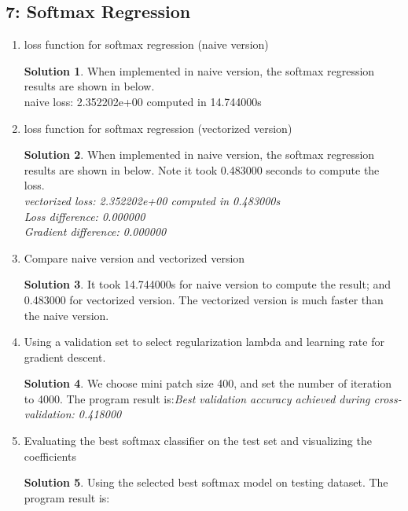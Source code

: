 \documentclass[]{book}
\theoremstyle{definition}
\newtheorem*{soln}{Solution}
\begin{document}
\subsection*{7: Softmax Regression}
\begin{enumerate}
\item loss function for softmax regression (naive version)
\begin{soln}
	When implemented in naive version, the softmax regression results are shown in below. \\
	naive loss: 2.352202e+00 computed in 14.744000s
\end{soln}
\item loss function for softmax regression (vectorized version)
\begin{soln}
	When implemented in naive version, the softmax regression results are shown in below. Note it took 0.483000 seconds to compute the loss. \\
	\textsl{
	vectorized loss: 2.352202e+00 computed in 0.483000s \\
	Loss difference: 0.000000 \\
	Gradient difference: 0.000000}
\end{soln}
\item Compare naive version and vectorized version

\begin{soln}
	It took 14.744000s for naive version to compute the result; and 0.483000 for vectorized version. The vectorized version is much faster than the naive version.
\end{soln}

\item Using a validation set to select regularization lambda and learning rate for gradient descent.
\begin{soln}
	We choose mini patch size 400, and set the number of iteration to 4000. The program result is:\textsl{Best validation accuracy achieved during cross-validation: 0.418000}
\end{soln}

\item Evaluating the best softmax classifier on the test set and visualizing the coefficients
\begin{soln}
	Using the selected best softmax model on testing dataset. The program result is:
	

\end{soln}
\end{enumerate}
\end{document}
